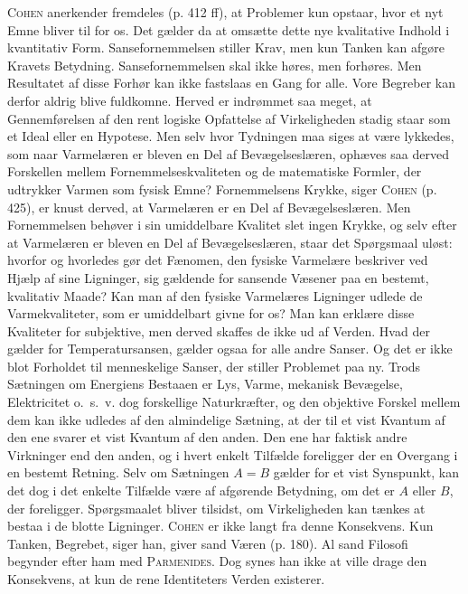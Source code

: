 \documentclass[12pt]{article}
\newcommand{\opage}[1]{\marginnote{\footnotesize\textit{[#1]}}}
\begin{document}
\textsc{Cohen} anerkender fremdeles (p. 412 ff), at Problemer kun opstaar, hvor
et nyt Emne bliver til for os. Det gælder da at omsætte dette nye kvalitative
Indhold i kvantitativ Form. Sansefornemmelsen stiller Krav, men kun Tanken kan
afgøre Kravets Betydning. Sansefornemmelsen skal ikke høres, men forhøres. Men
Resultatet af disse Forhør kan ikke fastslaas en Gang for alle. Vore Begreber
kan derfor aldrig blive fuldkomne. Herved er indrømmet saa meget, at
Gennemførelsen af den rent logiske Opfattelse af Virkeligheden stadig staar som
et Ideal eller en Hypotese. Men selv hvor Tydningen maa siges at være lykkedes,
som naar Varmelæren er bleven en Del af Bevægelseslæren, ophæves saa derved
Forskellen mellem Fornemmelseskvaliteten og de matematiske Formler, der
udtrykker Varmen som fysisk Emne? Fornemmelsens Krykke, siger \textsc{Cohen} (p.
425), er knust derved, at Varmelæren er en Del af Bevægelseslæren. Men
Fornemmelsen behøver i sin umiddelbare Kvalitet slet ingen Krykke, og selv efter
at Varmelæren er bleven en Del af Bevægelseslæren, staar det Spørgsmaal uløst:
hvorfor og hvorledes gør det Fænomen, den fysiske Varmelære beskriver ved Hjælp
af sine Ligninger, sig gældende for sansende Væsener paa en bestemt, kvalitativ
Maade? Kan man af den fysiske Varmelæres Ligninger udlede de Varmekvaliteter,
som er umiddelbart givne for os? Man kan erklære disse Kvaliteter for
subjektive, men derved skaffes de ikke ud af Verden. Hvad der gælder for
Temperatursansen, gælder ogsaa for alle andre Sanser. Og det er ikke blot
Forholdet til menneskelige Sanser, der stiller Problemet paa ny. Trods Sætningen
om Energiens Bestaaen er Lys, Varme, mekanisk Bevægelse, Elektricitet o.~s.~v.
dog forskellige Naturkræfter, og den objektive Forskel mellem dem kan ikke
udledes af den almindelige Sætning, at der til et vist Kvantum af den ene svarer
et vist Kvantum af den anden. Den ene har faktisk andre Virkninger end den
anden, og i hvert enkelt Tilfælde foreligger der en Overgang i en bestemt
Retning. Selv om Sætningen $A = B$ gælder for et vist Synspunkt, kan det dog i
det enkelte Tilfælde være af afgørende Betydning, om det er $A$ eller $B$,
\setcounter{footnote}{0}%
\opage{48}der foreligger. Spørgsmaalet bliver tilsidst, om Virkeligheden kan
tænkes at bestaa i de blotte Ligninger. \textsc{Cohen} er ikke langt fra denne
Konsekvens. Kun Tanken, Begrebet, siger han, giver sand Væren (p. 180). Al sand
Filosofi begynder efter ham med \textsc{Parmenides}. Dog synes han ikke at ville
drage den Konsekvens, at kun de rene Identiteters Verden existerer.
\end{document}
